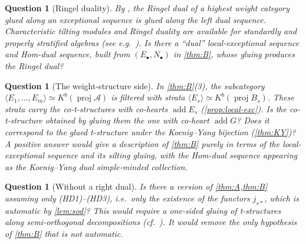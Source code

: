 \documentclass[11pt,reqno]{amsart}
\theoremstyle{plain}
\newtheorem{question}[theorem]{Question}
\theoremstyle{definition}
\theoremstyle{remark}
\DeclareMathOperator{\add}{add}
\newcommand{\proj}{\operatorname{proj}}
\newcommand{\Kb}{K^b}
\newcommand{\thick}[1]{\langle #1\rangle}
\newcommand{\cA}{\mathcal{A}}
\begin{document}
\begin{question}[Ringel duality]
By \cite[Thm.~3.2]{BB26}, the Ringel dual of a highest weight category glued along an exceptional sequence is glued along the left dual sequence. Characteristic tilting modules and Ringel duality are available for standardly and properly stratified algebras (see e.g.\ \cite{AHLU00}). Is there a ``dual'' local-exceptional sequence and Hom-dual sequence, built from $(E_\bullet,N_\bullet)$ in \cref{thm:B}, whose gluing produces the Ringel dual?
\end{question}

\begin{question}[The weight-structure side]
In \cref{thm:B}(3), the subcategory $\thick{E_1,\dots,E_m}\simeq\Kb(\proj\cA)$ is filtered with strata $\thick{E_s}\simeq\Kb(\proj B_s)$. These strata carry the co-t-structures with co-hearts $\add E_s$ (\cref{prop:local-exc}). Is the co-t-structure obtained by gluing them \cite{LVY14} the one with co-heart $\add G$? Does it correspond to the glued t-structure under the Koenig--Yang bijection (\cref{thm:KY})? A positive answer would give a description of \cref{thm:B} purely in terms of the local-exceptional sequence and its silting gluing, with the Hom-dual sequence appearing as the Koenig--Yang dual simple-minded collection.
\end{question}

\begin{question}[Without a right dual]
Is there a version of \cref{thm:A,thm:B} assuming only (HD1)--(HD3), i.e.\ only the existence of the functors $j_{s*}$, which is automatic by \cref{lem:sod}? This would require a one-sided gluing of t-structures along semi-orthogonal decompositions (cf.\ \cite{CP10}). It would remove the only hypothesis of \cref{thm:B} that is not automatic.
\end{question}
\end{document}
